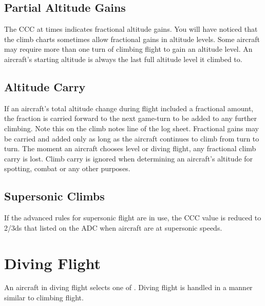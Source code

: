 \subsection{Partial Altitude Gains} The CCC at times indicates fractional altitude gains. You will have noticed that the climb charts sometimes allow fractional gains in altitude levels. Some aircraft may require more than one turn of climbing flight to gain an altitude level. An aircraft's starting altitude is always the last full altitude level it climbed to. 

\subsection{Altitude Carry} If an aircraft's total altitude change during flight included a fractional amount, the fraction is carried forward to the next game-turn to be added to any further climbing. Note this on the climb notes line of the log sheet. Fractional gains may be carried and added only as long as the aircraft continues to climb from turn to turn. The moment an aircraft chooses level or diving flight, any fractional climb carry is lost. Climb carry is ignored when determining an aircraft's altitude for spotting, combat or any other purposes.

\subsection{Supersonic Climbs} If the advanced rules for supersonic flight are in use, the CCC value is reduced to 2/3ds that listed on the ADC when aircraft are at supersonic speeds.

\section{Diving Flight}
\label{rule:diving-flight}

An aircraft in diving flight selects one of . Diving flight is handled in a manner similar to climbing flight. 

